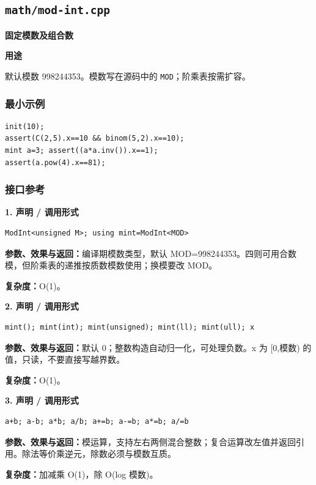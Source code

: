 \documentclass[UTF8,a4paper,10pt]{ctexart}
\newcommand{\TemplUsage}[1]{\textbf{用途}\par #1\par}
\begin{document}
\subsection{\texttt{math/mod-int.cpp}}
\textbf{固定模数及组合数}\par
\TemplUsage{默认模数 998244353。模数写在源码中的 \texttt{MOD}；阶乘表按需扩容。}
\subsubsection*{最小示例}
\begin{lstlisting}
init(10);
assert(C(2,5).x==10 && binom(5,2).x==10);
mint a=3; assert((a*a.inv()).x==1);
assert(a.pow(4).x==81);
\end{lstlisting}
\subsubsection*{接口参考}
\noindent\begin{minipage}{\textwidth}
\textbf{1. 声明 / 调用形式}
\begin{lstlisting}
ModInt<unsigned M>; using mint=ModInt<MOD>
\end{lstlisting}
\textbf{参数、效果与返回：}编译期模数类型，默认 MOD=998244353。四则可用合数模，但阶乘表的递推按质数模数使用；换模要改 MOD。

\textbf{复杂度：}O(1)。

\end{minipage}\par\vspace{0.4em}
\noindent\begin{minipage}{\textwidth}
\textbf{2. 声明 / 调用形式}
\begin{lstlisting}
mint(); mint(int); mint(unsigned); mint(ll); mint(ull); x
\end{lstlisting}
\textbf{参数、效果与返回：}默认 0；整数构造自动归一化，可处理负数。x 为 [0,模数) 的值，只读，不要直接写越界数。

\textbf{复杂度：}O(1)。

\end{minipage}\par\vspace{0.4em}
\noindent\begin{minipage}{\textwidth}
\textbf{3. 声明 / 调用形式}
\begin{lstlisting}
a+b; a-b; a*b; a/b; a+=b; a-=b; a*=b; a/=b
\end{lstlisting}
\textbf{参数、效果与返回：}模运算，支持左右两侧混合整数；复合运算改左值并返回引用。除法等价乘逆元，除数必须与模数互质。

\textbf{复杂度：}加减乘 O(1)，除 O(log 模数)。

\end{minipage}\par\vspace{0.4em}
\end{document}
